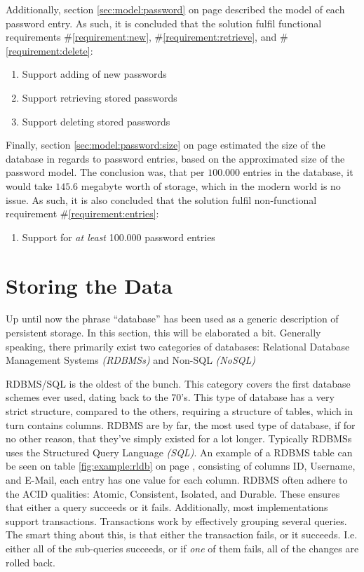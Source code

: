 			Additionally, section \ref{sec:model:password} on page \pageref{sec:model:password} described the model of each password entry. As such, it is concluded that the solution fulfil functional requirements \#\ref{requirement:new}, \#\ref{requirement:retrieve}, and \#\ref{requirement:delete}:
			\vspace{-3ex}\begin{enumerate}
				\setlength\itemsep{0.1em}
				\setcounter{enumi}{10-1}
				\item Support adding of new passwords
				\item Support retrieving stored passwords
				\item Support deleting stored passwords
			\end{enumerate}

			Finally, section \ref{sec:model:password:size} on page \pageref{sec:model:password:size} estimated the size of the database in regards to password entries, based on the approximated size of the password model. The conclusion was, that per $100.000$ entries in the database, it would take $145.6$ megabyte worth of storage, which in the modern world is no issue. As such, it is also concluded that the solution fulfil non-functional requirement \#\ref{requirement:entries}:
			\vspace{-3ex}\begin{enumerate}
				\setlength\itemsep{0.1em}
				\setcounter{enumi}{3-1}
				\item Support for \emph{at least} 100.000 password entries
			\end{enumerate}

	\section{Storing the Data}
		\label{sec:database:type}
		Up until now the phrase ``database'' has been used as a generic description of persistent storage. In this section, this will be elaborated a bit. Generally speaking, there primarily exist two categories of databases: Relational Database Management Systems \emph{(RDBMSs)} and Non-SQL \emph{(NoSQL)}

		RDBMS/SQL is the oldest of the bunch. This category covers the first database schemes ever used, dating back to the 70's. This type of database has a very strict structure, compared to the others, requiring a structure of tables, which in turn contains columns. RDBMS are by far, the most used type of database, if for no other reason, that they've simply existed for a lot longer. Typically RDBMSs uses the Structured Query Language \emph{(SQL)}. An example of a RDBMS table can be seen on table \ref{fig:example:rldb} on page \pageref{fig:example:rldb}, consisting of columns ID, Username, and E-Mail, each entry has one value for each column. RDBMS often adhere to the ACID qualities: Atomic, Consistent, Isolated, and Durable. These ensures that either a query succeeds or it fails. Additionally, most implementations support transactions. Transactions work by effectively grouping several queries. The smart thing about this, is that either the transaction fails, or it succeeds. I.e. either all of the sub-queries succeeds, or if \emph{one} of them fails, all of the changes are rolled back.

